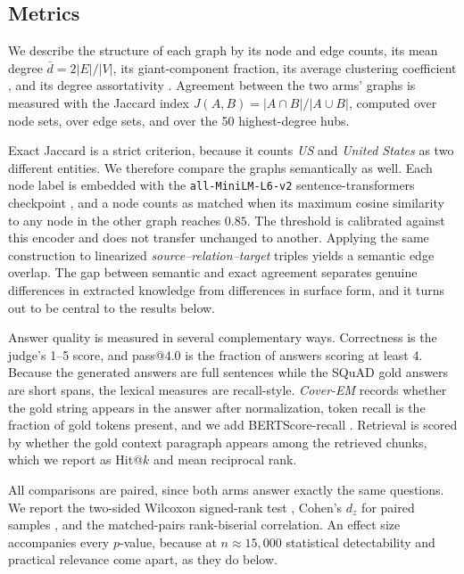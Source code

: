 \documentclass[conference, table]{IEEEtran}
\begin{document}
\subsection{Metrics}

\noindent
We describe the structure of each graph by its node and edge counts, its mean degree $\bar{d} = 2|E|/|V|$, its giant-component fraction, its average clustering coefficient \cite{watts1998}, and its degree assortativity \cite{newman2002}. Agreement between the two arms' graphs is measured with the Jaccard index $J(A,B) = |A \cap B| / |A \cup B|$, computed over node sets, over edge sets, and over the 50 highest-degree hubs.

\noindent
Exact Jaccard is a strict criterion, because it counts \emph{US} and \emph{United States} as two different entities. We therefore compare the graphs semantically as well. Each node label is embedded with the \texttt{all-MiniLM-L6-v2} sentence-transformers checkpoint \cite{minilm2020,sentencebert2019}, and a node counts as matched when its maximum cosine similarity to any node in the other graph reaches $0.85$. The threshold is calibrated against this encoder and does not transfer unchanged to another. Applying the same construction to linearized \emph{source--relation--target} triples yields a semantic edge overlap. The gap between semantic and exact agreement separates genuine differences in extracted knowledge from differences in surface form, and it turns out to be central to the results below.

\noindent
Answer quality is measured in several complementary ways. Correctness is the judge's 1--5 score, and pass@4.0 is the fraction of answers scoring at least 4. Because the generated answers are full sentences while the SQuAD gold answers are short spans, the lexical measures are recall-style. \emph{Cover-EM} records whether the gold string appears in the answer after normalization, token recall is the fraction of gold tokens present, and we add BERTScore-recall \cite{bertscore2020}. Retrieval is scored by whether the gold context paragraph appears among the retrieved chunks, which we report as Hit@$k$ and mean reciprocal rank.

\noindent
All comparisons are paired, since both arms answer exactly the same questions. We report the two-sided Wilcoxon signed-rank test \cite{wilcoxon1945}, Cohen's $d_z$ for paired samples \cite{cohen1988}, and the matched-pairs rank-biserial correlation. An effect size accompanies every $p$-value, because at $n \approx 15{,}000$ statistical detectability and practical relevance come apart, as they do below.
\end{document}
